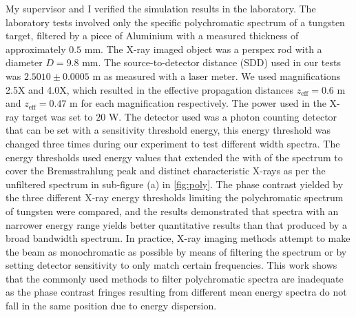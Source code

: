 \documentclass[10pt, a4paper, singlespacing]{report}
\begin{document}
My supervisor and I verified the simulation results in the laboratory. The laboratory tests involved only the specific polychromatic spectrum of a tungsten target, filtered by a piece of Aluminium with a measured thickness of approximately $0.5$ mm. The X-ray imaged object was a perspex rod with a diameter $D = 9.8$ mm. The source-to-detector distance (SDD) used in our tests was $2.5010 \pm 0.0005$ m as measured with a laser meter. We used magnifications 2.5X and 4.0X, which resulted in the effective propagation distances $z_{\mathrm{eff}} = 0.6$ m and $z_{\mathrm{eff}} = 0.47$ m for each magnification respectively. The power used in the X-ray target was set to $20$ W. The detector used was a photon counting detector that can be set with a sensitivity threshold energy, this energy threshold was changed three times during our experiment to test different width spectra. The energy thresholds used energy values that extended the with of the spectrum to cover the Bremsstrahlung peak and distinct characteristic X-rays as per the unfiltered spectrum in sub-figure (a) in \ref{fig:poly}.
The phase contrast yielded by the three different X-ray energy thresholds limiting the polychromatic spectrum of tungsten were compared, and the results demonstrated that spectra with an narrower energy range yields better quantitative results than that produced by a broad bandwidth spectrum. 
In practice, X-ray imaging methods attempt to make the beam as monochromatic as possible by means of filtering the spectrum or by setting detector sensitivity to only match certain frequencies. This work shows that the commonly used methods to filter polychromatic spectra are inadequate as the phase contrast fringes resulting from different mean energy spectra do not fall in the same position due to energy dispersion.

\end{document}
